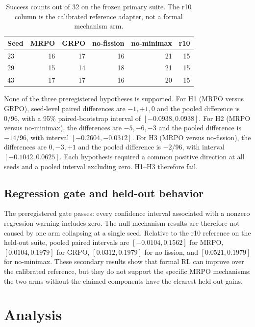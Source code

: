 \documentclass[10pt]{article}
\newcommand{\method}{\textsc{MRPO}}
\begin{document}
\begin{table}[t]
\centering
\small
\begin{tabular}{lrrrrr}
\toprule
Seed & \method{} & GRPO & no-fission & no-minimax & r10 \\
\midrule
23 & 16 & 17 & 16 & 21 & 15 \\
29 & 15 & 14 & 18 & 21 & 15 \\
43 & 17 & 17 & 16 & 20 & 15 \\
\bottomrule
\end{tabular}
\caption{Success counts out of 32 on the frozen primary suite.  The r10
column is the calibrated reference adapter, not a formal mechanism arm.}
\label{tab:r3-primary}
\end{table}

None of the three preregistered hypotheses is supported.  For H1
(\method{} versus GRPO), seed-level paired differences are $-1,+1,0$ and the
pooled difference is 0/96, with a 95\% paired-bootstrap interval of
$[-0.0938,0.0938]$.  For H2 (\method{} versus no-minimax), the differences are
$-5,-6,-3$ and the pooled difference is $-14$/96, with interval
$[-0.2604,-0.0312]$.  For H3 (\method{} versus no-fission), the differences
are $0,-3,+1$ and the pooled difference is $-2$/96, with interval
$[-0.1042,0.0625]$.  Each hypothesis required a common positive direction at
all seeds and a pooled interval excluding zero.  H1--H3 therefore fail.

\subsection{Regression gate and held-out behavior}

The preregistered gate passes: every confidence interval associated with a
nonzero regression warning includes zero.  The null mechanism results are
therefore not caused by one arm collapsing at a single seed.  Relative to the
r10 reference on the held-out suite, pooled paired intervals are
$[-0.0104,0.1562]$ for \method{}, $[0.0104,0.1979]$ for GRPO,
$[0.0312,0.1979]$ for no-fission, and $[0.0521,0.1979]$ for no-minimax.
These secondary results show that formal RL can improve over the calibrated
reference, but they do not support the specific \method{} mechanisms: the two
arms without the claimed components have the clearest held-out gains.

\section{Analysis}
\label{sec:analysis}
\end{document}
